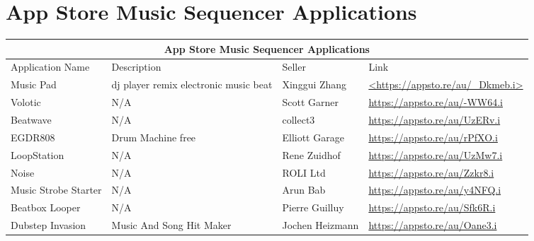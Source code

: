 \chapter{App Store Music Sequencer Applications}
\label{app:Appendix A}

\graphicspath{ {images/} }

\begin{tabular}{ |p{3cm}||p{3.5cm}|p{3.5cm}|p{3.5cm}||}
 \hline
 \multicolumn{4}{|c|}{App Store Music Sequencer Applications} \\
 \hline
 Application Name   & Description  & Seller & Link\\
 \hline
 Music Pad  & dj player remix electronic music beat & Xinggui Zhang & \url{<https://appsto.re/au/_Dkmeb.i>}\\

 Volotic & N/A & Scott Garner &
\url{ https://appsto.re/au/-WW64.i}\\

 Beatwave & N/A & collect3 &
 \url{https://appsto.re/au/UzERv.i}\\

 EGDR808 & Drum Machine free & Elliott Garage &
 \url{https://appsto.re/au/rPfXO.i}\\

 LoopStation & N/A & Rene Zuidhof &
 \url{https://appsto.re/au/UzMw7.i}\\

 Noise & N/A & ROLI Ltd &
 \url{https://appsto.re/au/Zzkr8.i}\\

 Music Strobe Starter & N/A & Arun Bab&
 \url{https://appsto.re/au/y4NFQ.i}\\

 Beatbox Looper & N/A & Pierre Guilluy&
 \url{https://appsto.re/au/Sfk6R.i}\\

 Dubstep Invasion & Music And Song Hit Maker & Jochen Heizmann&
 \url{https://appsto.re/au/Oane3.i}\\

 \hline
\end{tabular}
\fancyfoot[C]{\thepage}



